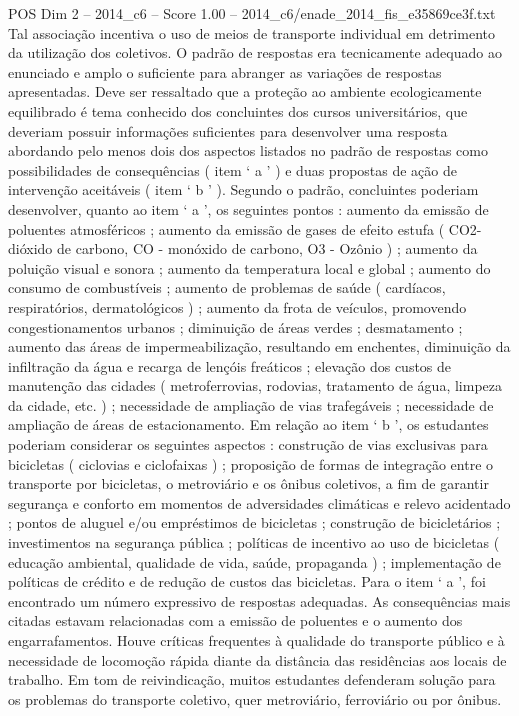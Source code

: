 \begin{textsample}{POS Dim 2 – 2014\_c6 – Score 1.00 – 2014\_c6/enade\_2014\_fis\_e35869ce3f.txt}
Tal associação incentiva o uso de meios de transporte individual em detrimento da utilização dos coletivos.
O padrão de respostas era tecnicamente adequado ao enunciado e amplo o suficiente para abranger as variações de respostas apresentadas.
Deve ser ressaltado que a proteção ao ambiente ecologicamente equilibrado é tema conhecido dos concluintes dos cursos universitários, que deveriam possuir informações suficientes para desenvolver uma resposta abordando pelo menos dois dos aspectos listados no padrão de respostas como possibilidades de consequências ( item ‘ a ’ ) e duas propostas de ação de intervenção aceitáveis ( item ‘ b ’ ).
Segundo o padrão, concluintes poderiam desenvolver, quanto ao item ‘ a ’, os seguintes pontos : aumento da emissão de poluentes atmosféricos ; aumento da emissão de gases de efeito estufa ( CO2- dióxido de carbono, CO - monóxido de carbono, O3 - Ozônio ) ; aumento da poluição visual e sonora ; aumento da temperatura local e global ; aumento do consumo de combustíveis ; aumento de problemas de saúde ( cardíacos, respiratórios, dermatológicos ) ; aumento da frota de veículos, promovendo congestionamentos urbanos ; diminuição de áreas verdes ; desmatamento ; aumento das áreas de impermeabilização, resultando em enchentes, diminuição da infiltração da água e recarga de lençóis freáticos ; elevação dos custos de manutenção das cidades ( metroferrovias, rodovias, tratamento de água, limpeza da cidade, etc. ) ; necessidade de ampliação de vias trafegáveis ; necessidade de ampliação de áreas de estacionamento.
Em relação ao item ‘ b ’, os estudantes poderiam considerar os seguintes aspectos : construção de vias exclusivas para bicicletas ( ciclovias e ciclofaixas ) ; proposição de formas de integração entre o transporte por bicicletas, o metroviário e os ônibus coletivos, a fim de garantir segurança e conforto em momentos de adversidades climáticas e relevo acidentado ; pontos de aluguel e/ou empréstimos de bicicletas ; construção de bicicletários ; investimentos na segurança pública ; políticas de incentivo ao uso de bicicletas ( educação ambiental, qualidade de vida, saúde, propaganda ) ; implementação de políticas de crédito e de redução de custos das bicicletas.
Para o item ‘ a ’, foi encontrado um número expressivo de respostas adequadas.
As consequências mais citadas estavam relacionadas com a emissão de poluentes e o aumento dos engarrafamentos.
Houve críticas frequentes à qualidade do transporte público e à necessidade de locomoção rápida diante da distância das residências aos locais de trabalho.
Em tom de reivindicação, muitos estudantes defenderam solução para os problemas do transporte coletivo, quer metroviário, ferroviário ou por ônibus.

\end{textsample}
